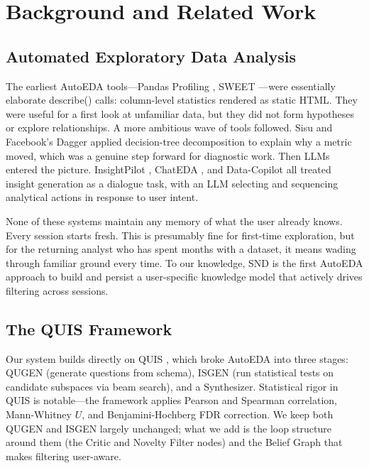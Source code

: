 \documentclass[conference]{IEEEtran}
\begin{document}
\section{Background and Related Work}
\label{sec:related}

\subsection{Automated Exploratory Data Analysis}

The earliest AutoEDA tools---Pandas Profiling \cite{pandas_profiling},
SWEET \cite{sweet2017}---were essentially elaborate describe() calls:
column-level statistics rendered as static HTML. They were useful for
a first look at unfamiliar data, but they did not form hypotheses or
explore relationships. A more ambitious wave of tools followed. Sisu
\cite{sisu} and Facebook's Dagger \cite{dagger2019} applied
decision-tree decomposition to explain why a metric moved, which was
a genuine step forward for diagnostic work. Then LLMs entered the
picture. InsightPilot \cite{wang2023insightpilot}, ChatEDA
\cite{chateda2024}, and Data-Copilot \cite{datacopilot2023} all
treated insight generation as a dialogue task, with an LLM selecting
and sequencing analytical actions in response to user intent.

None of these systems maintain any memory of what the user already
knows. Every session starts fresh. This is presumably fine for first-time
exploration, but for the returning analyst who has spent months with
a dataset, it means wading through familiar ground every time.
To our knowledge, SND is the first AutoEDA approach to build and
persist a user-specific knowledge model that actively drives filtering
across sessions.

\subsection{The QUIS Framework}

Our system builds directly on QUIS \cite{quis2024emnlp}, which broke
AutoEDA into three stages: QUGEN (generate questions from schema),
ISGEN (run statistical tests on candidate subspaces via beam search),
and a Synthesizer. Statistical rigor in QUIS is notable---the
framework applies Pearson and Spearman correlation, Mann-Whitney $U$,
and Benjamini-Hochberg FDR correction. We keep both QUGEN and ISGEN
largely unchanged; what we add is the loop structure around them
(the Critic and Novelty Filter nodes) and the Belief Graph that makes
filtering user-aware.
\end{document}
